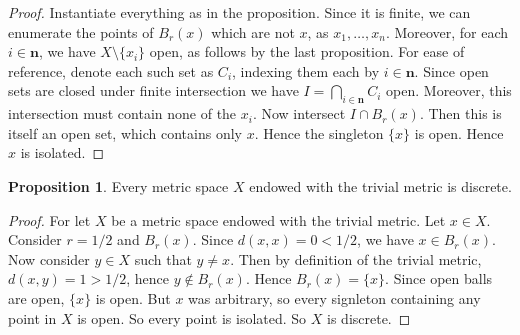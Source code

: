 \documentclass[11pt]{article}
\theoremstyle{definition}
\newtheorem{proposition}{Proposition}
\begin{document}
\begin{proof}
Instantiate everything as in the proposition. Since it is finite, we can enumerate the points of $B_r(x)$ which are not $x$, as $x_1, \dots, x_n$. Moreover, for each $i\in \mathbf{n}$, we have $X\setminus \{x_i\}$ open, as follows by the last proposition. For ease of reference, denote each such set as $C_i$, indexing them each by $i\in \mathbf{n}$. Since open sets are closed under finite intersection we have $I = \bigcap_{i\in \mathbf{n}} C_i$ open. Moreover, this intersection must contain none of the $x_i$. Now intersect $I\cap B_r(x)$. Then this is itself an open set, which contains only $x$. Hence the singleton $\{x\}$ is open. Hence $x$ is isolated.
\end{proof}

\begin{proposition}
Every metric space $X$ endowed with the trivial metric is discrete. 
\end{proposition}

\begin{proof}
For let $X$ be a metric space endowed with the trivial metric. Let $x\in X$. Consider $ r = 1/2$ and $B_{r}(x)$. Since $d(x,x) = 0 < 1/2$, we have $x\in B_r(x)$. Now consider $y\in X$ such that $y\ne x$. Then by definition of the trivial metric, $d(x,y ) = 1 > 1/2$, hence $y\not \in B_r(x)$. Hence $B_r(x) = \{x\}$. Since open balls are open, $\{x\}$ is open. But $x$ was arbitrary, so every signleton containing any point in $X$ is open. So every point is isolated. So $X$ is discrete.
\end{proof}
\end{document}
